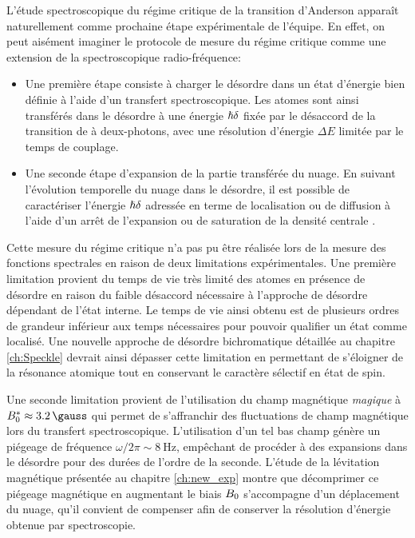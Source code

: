 L'étude spectroscopique du régime critique de la transition d'Anderson apparaît naturellement comme prochaine étape expérimentale de l'équipe. En effet, on peut aisément imaginer le protocole de mesure du régime critique comme une extension de la spectroscopique radio-fréquence:
\begin{itemize}
\item[\textendash] Une première étape consiste à charger le désordre dans un état d'énergie bien définie à l'aide d'un transfert spectroscopique. Les atomes sont ainsi transférés dans le désordre à une énergie $\hslash\delta$ fixée par le désaccord de la transition de à deux-photons, avec une résolution d'énergie $\Delta E$ limitée par le temps de couplage.
\item[\textendash] Une seconde étape d'expansion de la partie transférée du nuage. En suivant l'évolution temporelle du nuage dans le désordre, il est possible de caractériser l'énergie $\hslash\delta$ adressée en terme de localisation ou de diffusion à l'aide d'un arrêt de l'expansion ou de saturation de la densité centrale \citep{billy2008direct}\citep{jendrzejewski2012three}.
\end{itemize}

Cette mesure du régime critique n'a pas pu être réalisée lors de la mesure des fonctions spectrales en raison de deux limitations expérimentales. Une première limitation provient du temps de vie très limité des atomes en présence de désordre en raison du faible désaccord nécessaire à l'approche de désordre dépendant de l'état interne. Le temps de vie ainsi obtenu est de plusieurs ordres de grandeur inférieur aux temps nécessaires pour pouvoir qualifier un état comme localisé. Une nouvelle approche de désordre bichromatique détaillée au chapitre \ref{ch:Speckle} devrait ainsi dépasser cette limitation en permettant de s'éloigner de la résonance atomique tout en conservant le caractère sélectif en état de spin. 

Une seconde limitation provient de l'utilisation du champ magnétique \emph{magique} à $\Bzero^*\approx\SI{3.2}{\gauss}$ qui permet de s'affranchir des fluctuations de champ magnétique lors du transfert spectroscopique. L'utilisation d'un tel bas champ génère un piégeage de fréquence $\omega/2\pi\sim\SI{8}{\hertz}$, empêchant de procéder à des expansions dans le désordre pour des durées de l'ordre de la seconde. L'étude de la lévitation magnétique présentée au chapitre \ref{ch:new_exp} montre que décomprimer ce piégeage magnétique en augmentant le biais $B_0$ s'accompagne d'un déplacement du nuage, qu'il convient de compenser afin de conserver la résolution d'énergie obtenue par spectroscopie. 


